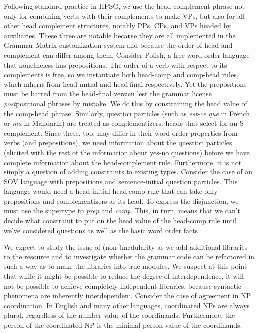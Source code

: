 \documentclass[11pt]{article}
\begin{document}
Following standard practice in HPSG, we use the head-complement phrase
not only for combining verbs with their complements to make VPs, but
also for all other head complement structures, notably PPs, CPs, and
VPs headed by auxiliaries.  These three are notable because they are
all implemented in the Grammar Matrix customization system and
because the order of head and complement can differ among them.
Consider Polish, a free word order language that nonetheless has
prepositions.  The order of a verb with respect to its complements is
free, so we instantiate both head-comp and comp-head rules, which
inherit from head-initial and head-final respectively. Yet the
prepositions must be barred from the head-final version lest the
grammar license {\it post}positional phrases by mistake. We do this by
constraining the {\sc head} value of the comp-head phrase.  Similarly,
question particles (such as {\it est-ce que} in French or {\it ma} in
Mandarin) are treated as complementizers: heads that select for an S
complement.  Since these, too, may differ in their word order
properties from verbs (and prepositions), we need information about
the question particles (elicited with the rest of the information
about yes-no questions) before we have complete information about the
head-complement rule.  Furthermore, it is not simply a question of
adding constraints to existing types. Consider the case of an SOV
language with prepositions and sentence-initial question particles.
This language would need a head-initial head-comp rule that can take
only prepositions and complementizers as its head.  To express the
disjunction, we must use the supertype to {\it prep} and {\it
comp}.  This, in turn, means that we can't decide what constraint to
put on the head value of the head-comp rule until we've considered
questions as well as the basic word order facts.

We expect to study the issue of (non-)modularity as we add additional
libraries to the resource and to investigate whether the grammar code
can be refactored in such a way as to make the libraries into true
modules.  We suspect at this point that while it might be possible to
reduce the degree of interdependence, it will not be possible to
achieve completely independent libraries, because syntactic phenomena
are inherently interdependent. Consider the case of
agreement in NP coordination. In English and many other languages, 
coordinated NPs are always plural, regardless of the number value of the
coordinands.  Furthermore, the person of the coordinated NP is the
minimal person value of the coordinands.  
\end{document}
